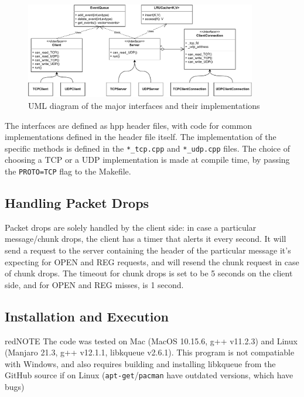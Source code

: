 \documentclass[12pt]{article}
\begin{document}
\begin{figure}[H]
  \centering
  \includegraphics[width=0.9\textwidth]{uml.pdf}
  \caption{UML diagram of the major interfaces and their implementations}
\end{figure}

The interfaces are defined as hpp header files, with code for common implementations defined in the header file itself. The implementation of the specific methods is defined in the \texttt{*\_tcp.cpp} and \texttt{*\_udp.cpp} files. The choice of choosing a TCP or a UDP implementation is made at compile time, by passing the \texttt{PROTO=TCP} flag to the Makefile.

\subsection{Handling Packet Drops}

Packet drops are solely handled by the client side: in case a particular message/chunk drops, the client has a timer that alerts it every second. It will send a request to the server containing the header of the particular message it's expecting for OPEN and REG requests, and will resend the chunk request in case of chunk drops. The timeout for chunk drops is set to be 5 seconds on the client side, and for OPEN and REG misses, is 1 second.

\clearpage

\subsection{Installation and Execution}

\begin{mybox}{red}{NOTE}
The code was tested on Mac (MacOS 10.15.6, g++ v11.2.3) and Linux (Manjaro 21.3, g++ v12.1.1, libkqueue v2.6.1). This program is not compatiable with Windows, and also requires building and installing libkqueue from the GitHub source if on Linux (\texttt{apt-get}/\texttt{pacman} have outdated versions, which have bugs)
\end{mybox}
\end{document}
